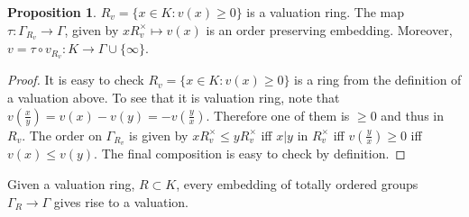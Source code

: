 \documentclass{article}
\theoremstyle{definition}
\theoremstyle{definition}
\theoremstyle{definition}
\newtheorem{proposition}{Proposition}[section]
\theoremstyle{definition}
\theoremstyle{definition}
\theoremstyle{definition}
\theoremstyle{definition}
\begin{document}
\begin{tcolorbox}[colback=blue!5!white,colframe=blue!30!white]
\begin{proposition}
$R_v=\{ x\in K:v(x)\geq 0 \}$ is a valuation ring. The map $\tau: \Gamma_{R_v}\to \Gamma$, given by $xR_v^{\times}\mapsto v(x)$ is an order preserving embedding. Moreover, $v=\tau \circ v_{R_v}: K\to \Gamma\cup \{\infty\}$.
\end{proposition}
\end{tcolorbox}
\begin{proof}
    It is easy to check $R_v=\{ x\in K:v(x)\geq 0 \}$ is a ring from the definition of a valuation above. To see that it is valuation ring, note that $v(\frac{x}{y})=v(x)-v(y)=-v(\frac{y}{x})$. Therefore one of them is $\geq 0$ and thus in $R_v$. The order on $\Gamma_{R_v}$ is given by $xR_v^{\times}\leq yR_v^{\times}$ iff $x|y$ in $R_v^{\times}$ iff $v(\frac{y}{x})\geq 0$ iff $v(x)\leq v(y)$. The final composition is easy to check by definition. 
\end{proof}

Given a valuation ring, $R\subset K$, every embedding of totally ordered groups $\Gamma_R\to \Gamma$ gives rise to a valuation.
\end{document}
